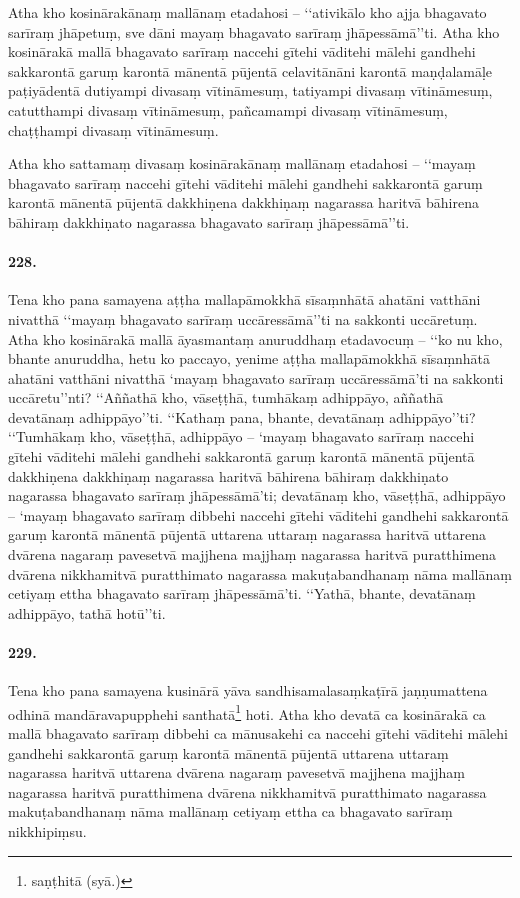 Atha kho kosinārakānaṃ mallānaṃ etadahosi – ‘‘ativikālo kho ajja bhagavato sarīraṃ jhāpetuṃ, sve dāni mayaṃ bhagavato sarīraṃ jhāpessāmā’’ti. Atha kho kosinārakā mallā bhagavato sarīraṃ naccehi gītehi vāditehi mālehi gandhehi sakkarontā garuṃ karontā mānentā pūjentā celavitānāni karontā maṇḍalamāḷe paṭiyādentā dutiyampi divasaṃ vītināmesuṃ, tatiyampi divasaṃ vītināmesuṃ, catutthampi divasaṃ vītināmesuṃ, pañcamampi divasaṃ vītināmesuṃ, chaṭṭhampi divasaṃ vītināmesuṃ.

Atha kho sattamaṃ divasaṃ kosinārakānaṃ mallānaṃ etadahosi – ‘‘mayaṃ bhagavato sarīraṃ naccehi gītehi vāditehi mālehi gandhehi sakkarontā garuṃ karontā mānentā pūjentā dakkhiṇena dakkhiṇaṃ nagarassa haritvā bāhirena bāhiraṃ dakkhiṇato nagarassa bhagavato sarīraṃ jhāpessāmā’’ti.

\paragraph{228.} Tena kho pana samayena aṭṭha mallapāmokkhā sīsaṃnhātā ahatāni vatthāni nivatthā ‘‘mayaṃ bhagavato sarīraṃ uccāressāmā’’ti na sakkonti uccāretuṃ. Atha kho kosinārakā mallā āyasmantaṃ anuruddhaṃ etadavocuṃ – ‘‘ko nu kho, bhante anuruddha, hetu ko paccayo, yenime aṭṭha mallapāmokkhā sīsaṃnhātā ahatāni vatthāni nivatthā ‘mayaṃ bhagavato sarīraṃ uccāressāmā’ti na sakkonti uccāretu’’nti? ‘‘Aññathā kho, vāseṭṭhā, tumhākaṃ adhippāyo, aññathā devatānaṃ adhippāyo’’ti. ‘‘Kathaṃ pana, bhante, devatānaṃ adhippāyo’’ti? ‘‘Tumhākaṃ kho, vāseṭṭhā, adhippāyo – ‘mayaṃ bhagavato sarīraṃ naccehi gītehi vāditehi mālehi gandhehi sakkarontā garuṃ karontā mānentā pūjentā dakkhiṇena dakkhiṇaṃ nagarassa haritvā bāhirena bāhiraṃ dakkhiṇato nagarassa bhagavato sarīraṃ jhāpessāmā’ti; devatānaṃ kho, vāseṭṭhā, adhippāyo – ‘mayaṃ bhagavato sarīraṃ dibbehi naccehi gītehi vāditehi gandhehi sakkarontā garuṃ karontā mānentā pūjentā uttarena uttaraṃ nagarassa haritvā uttarena dvārena nagaraṃ pavesetvā majjhena majjhaṃ nagarassa haritvā puratthimena dvārena nikkhamitvā puratthimato nagarassa makuṭabandhanaṃ nāma mallānaṃ cetiyaṃ ettha bhagavato sarīraṃ jhāpessāmā’ti. ‘‘Yathā, bhante, devatānaṃ adhippāyo, tathā hotū’’ti.

\paragraph{229.} Tena kho pana samayena kusinārā yāva sandhisamalasaṃkaṭīrā jaṇṇumattena odhinā mandāravapupphehi santhatā\footnote{saṇṭhitā (syā.)} hoti. Atha kho devatā ca kosinārakā ca mallā bhagavato sarīraṃ dibbehi ca mānusakehi ca naccehi gītehi vāditehi mālehi gandhehi sakkarontā garuṃ karontā mānentā pūjentā uttarena uttaraṃ nagarassa haritvā uttarena dvārena nagaraṃ pavesetvā majjhena majjhaṃ nagarassa haritvā puratthimena dvārena nikkhamitvā puratthimato nagarassa makuṭabandhanaṃ nāma mallānaṃ cetiyaṃ ettha ca bhagavato sarīraṃ nikkhipiṃsu.

